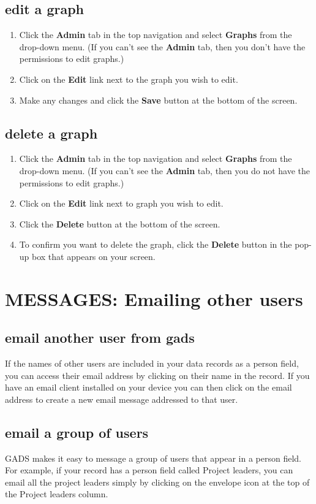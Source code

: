 \documentclass{ctrlo-int-toc}
\begin{document}
\begin{admin}
\subsection[edit a graph ]{edit a graph }
\begin{enumerate}
\item Click the \textbf{Admin} tab in the top navigation and select \textbf{Graphs} from the drop-down menu. (If you can't see the \textbf{Admin} tab, then you don't have the permissions to edit graphs.)
\item Click on the \textbf{Edit} link next to the graph you wish to edit. 
\item Make any changes and click the \textbf{Save} button at the bottom of the screen.
\end{enumerate}
\subsection[delete a graph ]{delete a graph }
\begin{enumerate}
\item Click the \textbf{Admin} tab in the top navigation and select \textbf{Graphs} from the drop-down menu. (If you can't see the \textbf{Admin} tab, then you do not have the permissions to edit graphs.)
\item Click on the \textbf{Edit} link next to graph you wish to edit.
\item Click the \textbf{Delete} button at the bottom of the screen.
\item To confirm you want to delete the graph, click the \textbf{Delete} button in the pop-up box that appears on your screen. 
\end{enumerate}
\clearpage\section[MESSAGES: Emailing other users]{MESSAGES: Emailing other users}
\subsection[email another user from gads ]{email another user from gads }
If the names of other users are included in your data records as a person field, you can access their email address by clicking on their name in the record. If you have an email client installed on your device you can then click on the email address to create a new email message addressed to that user. \ 

\subsection[email a group of users]{email a group of users}
GADS makes it easy to message a group of users that appear in a person field. For example, if your record has a person field called Project leaders, you can email all the project leaders simply by clicking on the envelope icon at the top of the Project leaders column. 


\end{admin}
\end{document}
